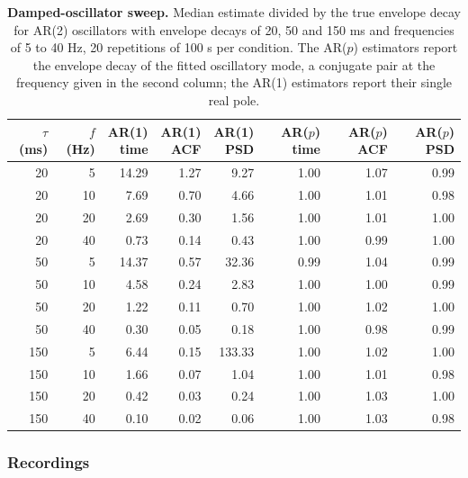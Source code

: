 \documentclass[pdflatex,lineno,sn-nature]{sn-jnl}
\theoremstyle{thmstyleone}
\theoremstyle{thmstyletwo}
\theoremstyle{thmstylethree}
\begin{document}
\begin{table}[h]
\caption{\textbf{Damped-oscillator sweep.} Median estimate divided by the true envelope decay for AR(2) oscillators with envelope decays of 20, 50 and 150 ms and frequencies of 5 to 40 Hz, 20 repetitions of 100 s per condition. The AR($p$) estimators report the envelope decay of the fitted oscillatory mode, a conjugate pair at the frequency given in the second column; the AR(1) estimators report their single real pole.}\label{tab:s_damped}
\setlength{\tabcolsep}{3pt}
\begin{tabular}{rrrrrrrr}
\toprule
\shortstack[c]{$\tau$ \\ (ms)} & \shortstack[c]{$f$ \\ (Hz)} & \shortstack[c]{AR(1) \\ time} & \shortstack[c]{AR(1) \\ ACF} & \shortstack[c]{AR(1) \\ PSD} & \shortstack[c]{AR($p$) \\ time} & \shortstack[c]{AR($p$) \\ ACF} & \shortstack[c]{AR($p$) \\ PSD} \\
\midrule
20 & 5 & 14.29 & 1.27 & 9.27 & 1.00 & 1.07 & 0.99 \\
20 & 10 & 7.69 & 0.70 & 4.66 & 1.00 & 1.01 & 0.98 \\
20 & 20 & 2.69 & 0.30 & 1.56 & 1.00 & 1.01 & 1.00 \\
20 & 40 & 0.73 & 0.14 & 0.43 & 1.00 & 0.99 & 1.00 \\
50 & 5 & 14.37 & 0.57 & 32.36 & 0.99 & 1.04 & 0.99 \\
50 & 10 & 4.58 & 0.24 & 2.83 & 1.00 & 1.00 & 0.99 \\
50 & 20 & 1.22 & 0.11 & 0.70 & 1.00 & 1.02 & 1.00 \\
50 & 40 & 0.30 & 0.05 & 0.18 & 1.00 & 0.98 & 0.99 \\
150 & 5 & 6.44 & 0.15 & 133.33 & 1.00 & 1.02 & 1.00 \\
150 & 10 & 1.66 & 0.07 & 1.04 & 1.00 & 1.01 & 0.98 \\
150 & 20 & 0.42 & 0.03 & 0.24 & 1.00 & 1.03 & 1.00 \\
150 & 40 & 0.10 & 0.02 & 0.06 & 1.00 & 1.03 & 0.98 \\
\bottomrule
\end{tabular}
\end{table}

\subsubsection*{Recordings}
\end{document}
